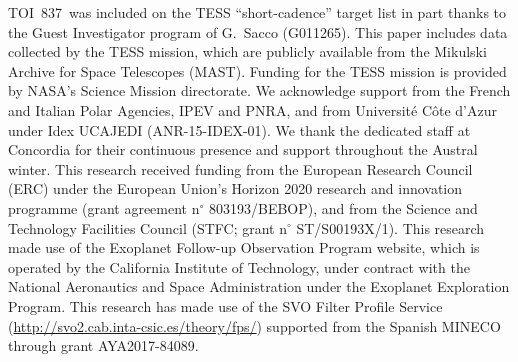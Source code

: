 \documentclass[12pt,twocolumn,tighten]{aastex63}
\newcommand{\tn}{TOI~837} %
\begin{document}
\clearpage





\acknowledgements
\tn\ was included on the TESS ``short-cadence'' target list in part
thanks to the Guest Investigator program of G.\ Sacco (G011265).
%
This paper includes data collected by the TESS mission, which are
publicly available from the Mikulski Archive for Space Telescopes
(MAST).
%
Funding for the TESS mission is provided by NASA's Science Mission
directorate.
%
We acknowledge support from the French and Italian Polar Agencies, IPEV and PNRA, and from Universit\'e C\^ote d’Azur under Idex UCAJEDI (ANR-15-IDEX-01). We thank the dedicated staff at Concordia for their continuous presence and support throughout the Austral winter.
%
This research received funding from the European Research Council (ERC) under the European Union's Horizon 2020 research and innovation programme (grant agreement n$^\circ$ 803193/BEBOP), and from the Science and Technology Facilities Council (STFC; grant n$^\circ$ ST/S00193X/1).
%
%
This research made use of the Exoplanet Follow-up Observation
Program website, which is operated by the California Institute of
Technology, under contract with the National Aeronautics and Space
Administration under the Exoplanet Exploration Program.
%
This research has made use of the SVO Filter Profile Service
(\url{http://svo2.cab.inta-csic.es/theory/fps/}) supported from the Spanish
MINECO through grant AYA2017-84089.
%
%
%
\end{document}
